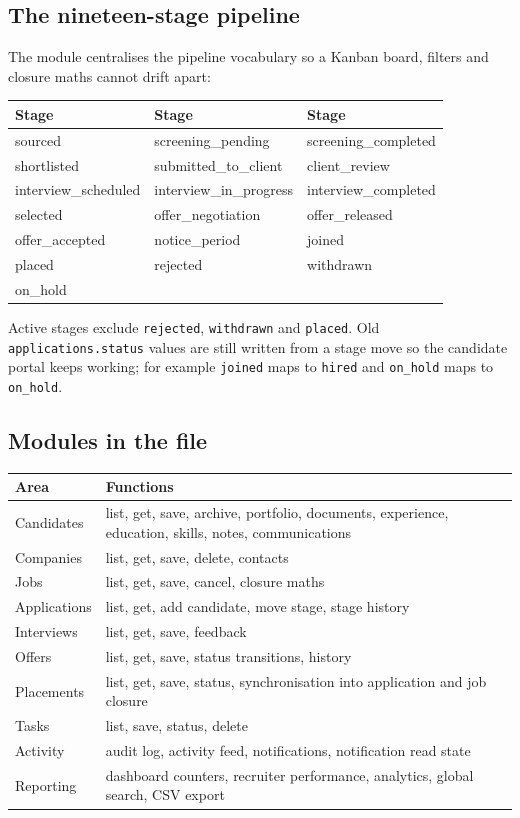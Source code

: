 \documentclass[11pt,a4paper]{article}
\newcommand{\code}[1]{\texttt{#1}}
\begin{document}
\subsection{The nineteen-stage pipeline}
The module centralises the pipeline vocabulary so a Kanban board, filters and
closure maths cannot drift apart:
\begin{center}
\begin{tabular}{@{}lll@{}}
\toprule
\textbf{Stage} & \textbf{Stage} & \textbf{Stage}\\
\midrule
sourced & screening\_pending & screening\_completed\\
shortlisted & submitted\_to\_client & client\_review\\
interview\_scheduled & interview\_in\_progress & interview\_completed\\
selected & offer\_negotiation & offer\_released\\
offer\_accepted & notice\_period & joined\\
placed & rejected & withdrawn\\
on\_hold & & \\
\bottomrule
\end{tabular}
\end{center}
Active stages exclude \code{rejected}, \code{withdrawn} and \code{placed}.
Old \code{applications.status} values are still written from a stage move so
the candidate portal keeps working; for example \code{joined} maps to
\code{hired} and \code{on\_hold} maps to \code{on\_hold}.

\subsection{Modules in the file}
\begin{center}
\begin{tabular}{@{}lp{11cm}@{}}
\toprule
\textbf{Area} & \textbf{Functions}\\
\midrule
Candidates & list, get, save, archive, portfolio, documents, experience,
  education, skills, notes, communications\\
Companies & list, get, save, delete, contacts\\
Jobs & list, get, save, cancel, closure maths\\
Applications & list, get, add candidate, move stage, stage history\\
Interviews & list, get, save, feedback\\
Offers & list, get, save, status transitions, history\\
Placements & list, get, save, status, synchronisation into application and
  job closure\\
Tasks & list, save, status, delete\\
Activity & audit log, activity feed, notifications, notification read state\\
Reporting & dashboard counters, recruiter performance, analytics, global
  search, CSV export\\
\bottomrule
\end{tabular}
\end{center}
\end{document}

